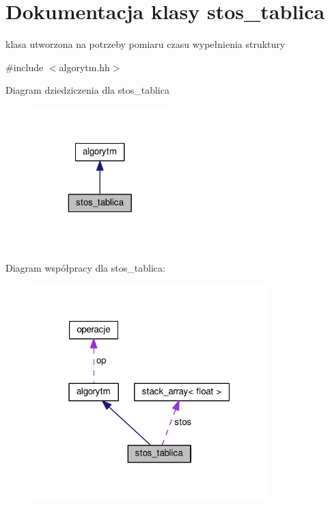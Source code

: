\hypertarget{classstos__tablica}{\section{Dokumentacja klasy stos\-\_\-tablica}
\label{classstos__tablica}
}


klasa utworzona na potrzeby pomiaru czasu wypełnienia struktury  




{\ttfamily \#include $<$algorytm.\-hh$>$}



Diagram dziedziczenia dla stos\-\_\-tablica\nopagebreak
\begin{figure}[H]
\begin{center}
\leavevmode
\includegraphics[width=148pt]{classstos__tablica__inherit__graph}
\end{center}
\end{figure}


Diagram współpracy dla stos\-\_\-tablica\-:\nopagebreak
\begin{figure}[H]
\begin{center}
\leavevmode
\includegraphics[width=256pt]{classstos__tablica__coll__graph}
\end{center}
\end{figure}
